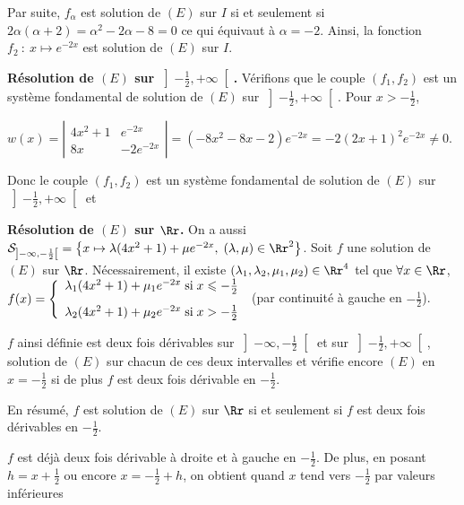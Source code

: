 {\begin{enumerate}
{Par suite, $f_{\alpha}$ est solution de $(E)$ sur $I$ si et seulement si $2\alpha(\alpha+2)=\alpha^2-2\alpha-8=0$ ce qui équivaut à $\alpha=-2$. Ainsi, la fonction $f_2~:~x\mapsto e^{-2x}$ est solution de $(E)$ sur $I$.

\textbf{Résolution de $(E)$ sur $\left]- \frac{1}{2},+\infty\right[$.} Vérifions que le couple $(f_1,f_2)$ est un système fondamental de solution de $(E)$ sur $\left]- \frac{1}{2},+\infty\right[$. Pour $x>- \frac{1}{2}$,

\begin{center}
$w(x)=\left|
\begin{array}{cc}
4x^2+1&e^{-2x}\\
8x&-2e^{-2x}
\end{array}
\right|
=(-8x^2-8x-2)e^{-2x}=-2(2x+1)^2e^{-2x}\neq0$.
\end{center}

Donc le couple $(f_1,f_2)$ est un système fondamental de solution de $(E)$ sur $\left]- \frac{1}{2},+\infty\right[$ et

\begin{center}
\shadowbox{
$\mathcal{S}_{\left]-\frac{1}{2},+\infty\right[}=\left\{x\mapsto\lambda(4x^2+1)+\mu e^{-2x},\;(\lambda,\mu)\in\Rr^2\right\}$.
}
\end{center}

\textbf{Résolution de $(E)$ sur $\Rr$.} On a aussi $\mathcal{S}_{\left]-\infty,-\frac{1}{2}\right[}=\left\{x\mapsto\lambda(4x^2+1)+\mu e^{-2x},\;(\lambda,\mu)\in\Rr^2\right\}$. Soit $f$ une solution de $(E)$ sur $\Rr$. Nécessairement, il existe $(\lambda_1,\lambda_2,\mu_1,\mu_2)\in\Rr^4$ tel que $\forall x\in\Rr$, $f(x)=\left\{
\begin{array}{l}
\lambda_1(4x^2+1)+\mu_1 e^{-2x}\;\text{si}\;x\leqslant- \frac{1}{2}\\
\rule{0mm}{6mm}\lambda_2(4x^2+1)+\mu_2 e^{-2x}\;\text{si}\;x>- \frac{1}{2}
\end{array}
\right.$ (par continuité à gauche en $- \frac{1}{2}$).

$f$ ainsi définie est deux fois dérivables sur $\left]-\infty,- \frac{1}{2}\right[$ et sur $\left]- \frac{1}{2},+\infty\right[$, solution de $(E)$ sur chacun de ces deux intervalles et vérifie encore $(E)$ en $x=- \frac{1}{2}$ si de plus $f$ est deux fois dérivable en $- \frac{1}{2}$. 

En résumé, $f$ est solution de $(E)$ sur $\Rr$ si et seulement si $f$ est deux fois dérivables en $- \frac{1}{2}$.

$f$ est déjà deux fois dérivable à droite et à gauche en $- \frac{1}{2}$. De plus, en posant $h=x+ \frac{1}{2}$ ou encore $x=- \frac{1}{2}+h$, on obtient quand $x$ tend vers $- \frac{1}{2}$ par valeurs inférieures

}
\end{enumerate}}
